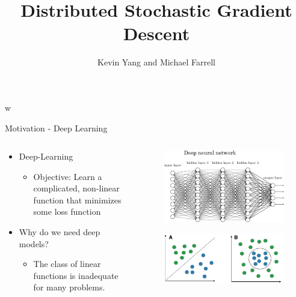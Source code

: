 \documentclass{beamer}
\title{ Distributed Stochastic Gradient Descent }
\author{Kevin Yang and Michael Farrell}
\begin{document}
\begin{frame}w
  \titlepage
\end{frame}

\begin{frame}{Motivation - Deep Learning}

\begin{columns}[T] %
\begin{column}{.48\textwidth}
\begin{itemize}
\item Deep-Learning
\begin{itemize}
\item Objective: Learn a complicated, non-linear function that minimizes some loss function
\end{itemize}
\item Why do we need deep models?
\begin{itemize}
\item The class of linear functions is inadequate for many problems.
\end{itemize}
\end{itemize}
\end{column}%
\hfill%
\begin{column}{.48\textwidth}
\begin{figure}
    \includegraphics[scale = .35]{./img/deep_learning}
      \caption{}
\end{figure}
\begin{figure}
    \includegraphics[scale = .17]{./img/lin_v_nonlin}
      \caption{}
\end{figure}
\end{column}%
\end{columns}
\end{frame}
\end{document}
